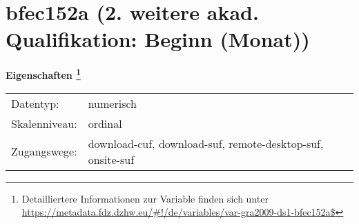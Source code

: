 
    \setcounter{footnote}{0}

    \vspace*{-1.8cm}
	\section{bfec152a (2. weitere akad. Qualifikation: Beginn (Monat))}
	\label{section:bfec152a}



    \vspace*{0.5cm}
    \noindent\textbf{Eigenschaften
	\footnote{Detailliertere Informationen zur Variable finden sich unter
		\url{https://metadata.fdz.dzhw.eu/\#!/de/variables/var-gra2009-ds1-bfec152a$}}}\\
	\begin{tabularx}{\hsize}{@{}lX}
	Datentyp: & numerisch \\
	Skalenniveau: & ordinal \\
	Zugangswege: &
	  download-cuf, 
	  download-suf, 
	  remote-desktop-suf, 
	  onsite-suf
 \\
    \end{tabularx}



